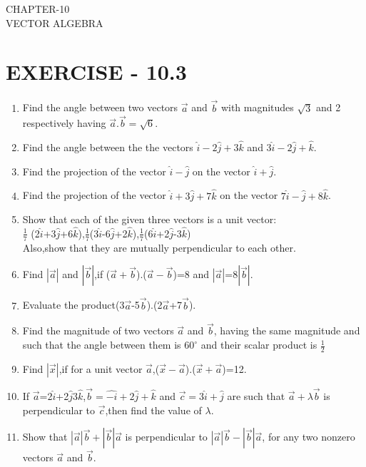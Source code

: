 \documentclass[12pt]{article}
\begin{document}
\begin{center}
\textbf\large{CHAPTER-10 \\ VECTOR ALGEBRA}
\end{center}

\section{EXERCISE - 10.3}
\begin{enumerate}
\item Find the angle between two vectors $\vec{a}$ and $\vec{b} $ with magnitudes $\sqrt{3}$ and 2 respectively having $\vec{a}.\vec{b}=\sqrt{6}$.
\item Find the angle between the the vectors $\hat{i}-2\hat{j}+3\hat{k}$ and $3\hat{i}-2\hat{j}+\hat{k}$.
\item Find the projection of the vector $\hat{i}-\hat{j}$ on the vector $\hat{i}+\hat{j}$.
\item Find the projection of the vector $\hat{i}+3\hat{j}+7\hat{k}$ on the vector $7\hat{i}-\hat{j}+8\hat{k}$.
\item Show that each of the given three vectors is a unit vector: 
\\ $\frac{1}{7}$ (2$\hat{i}$+3$\hat{j}$+6$\hat{k}$),$\frac{1}{7}$(3$\hat{i}$-6$\hat{j}$+2$\hat{k}$),$\frac{1}{7}$(6$\hat{i}$+2$\hat{j}$-3$\hat{k}$)
\\Also,show that they are mutually perpendicular to each other.
\item Find $\left| \vec{a} \right|$ and $\left| \vec{b} \right|$,if ($\vec{a}+\vec{b}$).($\vec{a}-\vec{b}$)=8 and $\left| \vec{a} \right|$=8$\left| \vec{b}\right|$.
\item Evaluate the product(3$\vec{a}$-5$\vec{b}$).(2$\vec{a}$+7$\vec{b}$).
\item Find the magnitude of two vectors $\vec{a}$ and $\vec{b}$, having the same magnitude and such that the angle between them is $60^\circ$ and their scalar product is $\frac{1}{2}$
\item Find $\left| \vec{x} \right|$,if for a unit vector $\vec{a}$,($\vec{x}-\vec{a}$).($\vec{x}+\vec{a}$)=12.
\item If $\vec{a}$=2$\hat{i}$+2$\hat{j}$3$\hat{k}$,$\vec{b}=\hat{-i}+2\hat{j}+\hat{k}$ and $\vec{c}=3\hat{i}+\hat{j}$ are such that $\vec{a}+\lambda\vec{b}$ is perpendicular to $\vec{c}$,then find the value of $\lambda$.
\item Show that $\left| \vec{a}\right|\vec{b}+\left| \vec{b}\right|\vec{a}$ is perpendicular to $\left| \vec{a} \right| \vec{b}-\left| \vec{b} \right| \vec{a}$, for any two nonzero vectors $\vec{a}$ and $\vec{b}$.

\end{enumerate}
\end{document}
